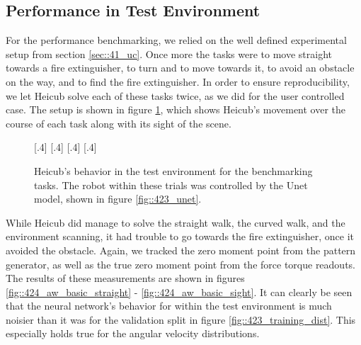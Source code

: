 \subsection{Performance in Test Environment}
\label{sec::424_pt}
For the performance benchmarking, we relied on the well defined experimental setup from section \ref{sec::41_uc}. Once more the tasks were to move straight towards a fire extinguisher, to turn and to move towards it, to avoid an obstacle on the way, and to find the fire extinguisher. In order to ensure reproducibility, we let Heicub solve each of these tasks twice, as we did for the user controlled case. The setup is shown in figure \ref{fig::424_aw_gif_basic}, which shows Heicub's movement over the course of each task along with its sight of the scene.
\begin{figure}[h!]
	\centering
	[.4\linewidth]{}
	[.4\linewidth]{}
	[.4\linewidth]{}
	[.4\linewidth]{}
	\caption{Heicub's behavior in the test environment for the benchmarking tasks. The robot within these trials was controlled by the Unet model, shown in figure \ref{fig::423_unet}.}
	\label{fig::424_aw_gif_basic}
\end{figure} 
While Heicub did manage to solve the straight walk, the curved walk, and the environment scanning, it had trouble to go towards the fire extinguisher, once it avoided the obstacle. Again, we tracked the zero moment point from the pattern generator, as well as the true zero moment point from the force torque readouts. The results of these measurements are shown in figures \ref{fig::424_aw_basic_straight} - \ref{fig::424_aw_basic_sight}. It can clearly be seen that the neural network's behavior for within the test environment is much noisier than it was for the validation split in figure \ref{fig::423_training_dist}. This especially holds true for the angular velocity distributions. 
